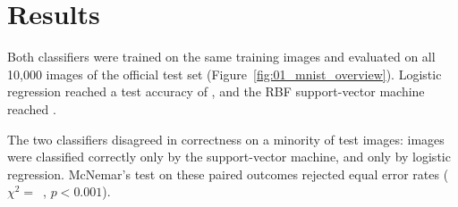 \section{Results}

Both classifiers were trained on the same  training images
and evaluated on all 10,000 images of the official test set
(Figure~\ref{fig:01_mnist_overview}).
Logistic regression reached a test accuracy of ,
and the RBF support-vector machine reached .

The two classifiers disagreed in correctness on a minority of test images:
 images were classified correctly only by the
support-vector machine, and  only by logistic
regression. McNemar's test on these paired outcomes rejected equal error
rates ($\chi^2 = $~, $p < 0.001$).

